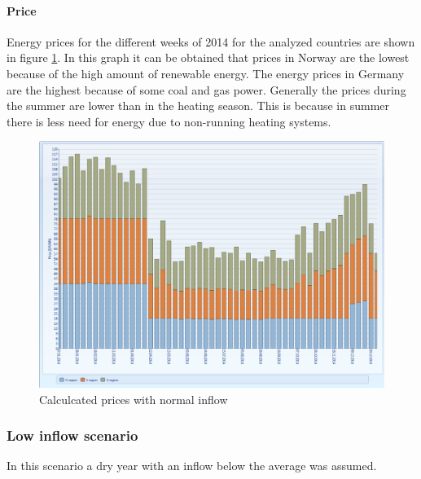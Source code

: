 \documentclass{article}
\begin{document}
\paragraph{Price\\}
Energy prices for the different weeks of 2014 for the analyzed countries are shown in figure \ref{fig:MTpricesnormal}. In this graph it can be obtained that prices in Norway are the lowest because of the high amount of renewable energy. The energy prices in Germany are the highest because of some coal and gas power. Generally the prices during the summer are lower than in the heating season. This is because in summer there is less need for energy due to non-running heating systems.
\begin{figure}[htbp]
\begin{center}
\includegraphics[width=13cm,keepaspectratio=true]{figures/MTprices}
\caption{Calculcated prices with normal inflow}
\label{fig:MTpricesnormal}
\end{center}
\end{figure}

\subsubsection{Low inflow scenario}
In this scenario a dry year with an inflow below the average was assumed. 
\end{document}
